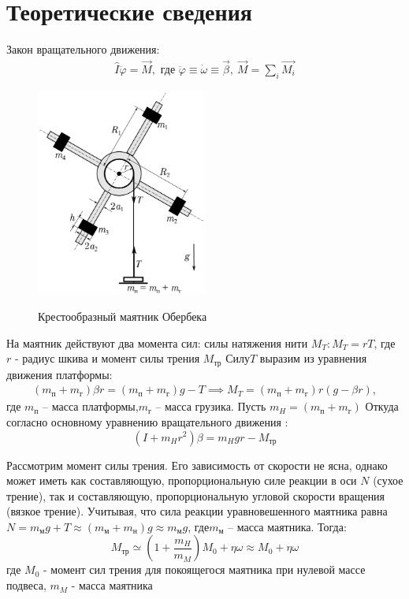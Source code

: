 \documentclass[a4paper,12pt]{article} %
\begin{document}
\section{Теоретические сведения}
Закон вращательного движения:
\begin{gather}
	\hat{I}\ddot{\varphi} =\overset{\to}{ M} \label{1},\text{ где } \ddot{\varphi} \equiv \dot{\omega} \equiv \vec\beta, \ \overset{\to}{ M} = \sum_i \overset{ \to}{ M_i}
\end{gather}
\begin{figure}[h!]
\begin{center}
    \label{pic}
\includegraphics[width=0.5\textwidth]{images/Маятник.png}
\end{center}
\caption{Крестообразный маятник Обербека} \label{маятник}
\end{figure}
На маятник действуют два момента сил: силы натяжения нити $M_T: M_T = rT$, где $r$ - радиус шкива и момент силы трения $ M_\text{тр} $ 
Силу$ T $ выразим из уравнения движения платформы:\begin{gather}
	(m_\text{п} + m_\text{г})\beta r = (m_\text{п} + m_\text{г})g - T \implies M_T =(m_\text{п} + m_\text{г})r(g - \beta r),
\end{gather} где $ m_\text{п} $ -- масса платформы,$ m_\text{г} $ -- масса грузика. 
Пусть $ m_H = (m_\text{п} + m_\text{г}) $ 
Откуда согласно основному уравнению вращательного движения :
\begin{equation}
(I+m_Hr^2)\beta = m_Hgr-M_\text{тр}
\label{M_T}
\end{equation}

Рассмотрим момент силы трения. Его зависимость от скорости не ясна, однако может иметь как составляющую, пропорциональную силе реакции в оси $N$ (сухое трение), так и составляющую, пропорциональную угловой скорости вращения (вязкое трение). Учитывая, что сила реакции уравновешенного маятника равна $ N = m_\text{м}g + T \approx (m_\text{м} + m_\text{н})g \approx m_\text{м}g $,  где$ m_\text{м} $ -- масса маятника. Тогда:
\begin{equation}
M_\text{тр} \simeq \left(1 + \frac{m_H}{m_M}\right) M_0 + \eta \omega \approx M_0 +\eta \omega
\label{трение}
\end{equation} 
где $M_0$ - момент сил трения для покоящегося маятника при нулевой массе подвеса, $m_M$ - масса маятника 
\end{document}
